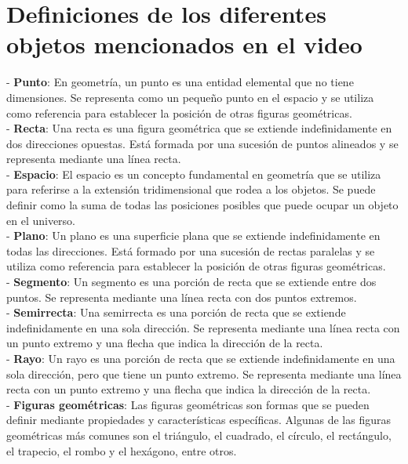 \documentclass[10pt]{article}
\begin{document}
\section{Definiciones de los diferentes objetos mencionados en el video}
- {\bf Punto}: En geometría, un punto es una entidad elemental que no tiene dimensiones. Se representa como un pequeño punto en el espacio y se utiliza como referencia para establecer la posición de otras figuras geométricas. \\
- {\bf Recta}: Una recta es una figura geométrica que se extiende indefinidamente en dos direcciones opuestas. Está formada por una sucesión de puntos alineados y se representa mediante una línea recta.\\
- {\bf Espacio}: El espacio es un concepto fundamental en geometría que se utiliza para referirse a la extensión tridimensional que rodea a los objetos. Se puede definir como la suma de todas las posiciones posibles que puede ocupar un objeto en el universo.\\
- {\bf Plano}: Un plano es una superficie plana que se extiende indefinidamente en todas las direcciones. Está formado por una sucesión de rectas paralelas y se utiliza como referencia para establecer la posición de otras figuras geométricas.\\
- {\bf Segmento}: Un segmento es una porción de recta que se extiende entre dos puntos. Se representa mediante una línea recta con dos puntos extremos.\\
- {\bf Semirrecta}: Una semirrecta es una porción de recta que se extiende indefinidamente en una sola dirección. Se representa mediante una línea recta con un punto extremo y una flecha que indica la dirección de la recta.\\
- {\bf Rayo}: Un rayo es una porción de recta que se extiende indefinidamente en una sola dirección, pero que tiene un punto extremo. Se representa mediante una línea recta con un punto extremo y una flecha que indica la dirección de la recta.\\
- {\bf Figuras geométricas}: Las figuras geométricas son formas que se pueden definir mediante propiedades y características específicas. Algunas de las figuras geométricas más comunes son el triángulo, el cuadrado, el círculo, el rectángulo, el trapecio, el rombo y el hexágono, entre otros.


\end{document}
